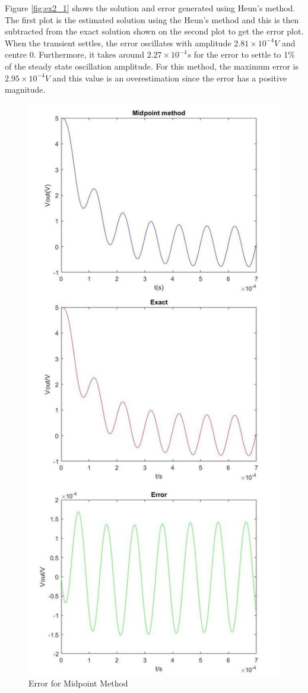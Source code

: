 \documentclass[11pt, oneside, titlepage]{article}   	%
\begin{document}
Figure \ref{fig:ex2_1} shows the solution and error generated using Heun's method. The first plot is the estimated solution using the Heun's method and this is then subtracted from the exact solution shown on the second plot to get the error plot. When the transient settles, the error oscillates with amplitude $2.81\times10^{-4}V$ and centre 0. Furthermore, it takes around $2.27\times10^{-4}s$ for the error to settle to 1\% of the steady state oscillation amplitude. For this method, the maximum error is $2.95\times10^{-4}V$ and this value is an overestimation since the error has a positive magnitude.

\begin{figure}[H]
\center
\includegraphics[scale = 0.35]{exercise2_2}
\caption{Error for Midpoint Method} \label{fig:ex2_2}
\end{figure}
\end{document}
